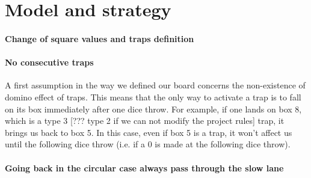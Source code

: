 \section{Model and strategy} %
\label{sec:model_and_strategy}

\paragraph{Change of square values and traps definition} %
\label{par:change_of_square_values_and_traps_definition}


\paragraph{No consecutive traps} %
\label{par:no_consecutive_traps}
A first assumption in the way we defined our board concerns the non-existence
of domino effect of traps. This means that the only way to activate a trap
is to fall on its box immediately after one dice throw.
For example, if one lands on box 8, which is a type 3 [??? type 2 if we can not
modify the project rules] trap, it brings us back to box 5. In this case,
even if box 5 is a trap, it won't affect us until the following dice throw
(i.e. if a 0 is made at the following dice throw).

\paragraph{Going back in the circular case always pass through the slow lane} %
\label{par:going_back_in_the_circular_case_always_pass_through_the_slow_lane}


